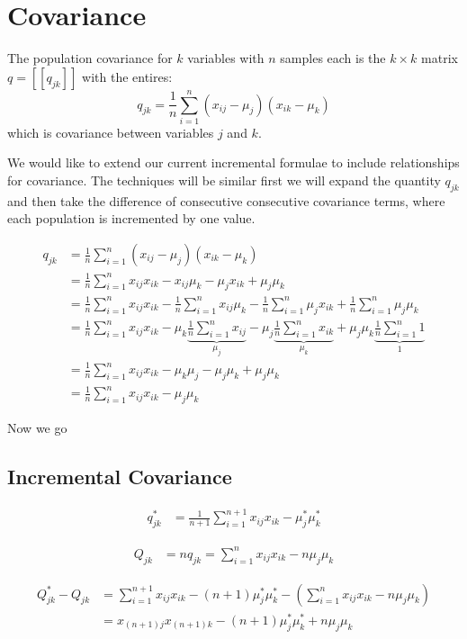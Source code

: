 \documentclass[english,12pt]{article}
\theoremstyle{plain}
\theoremstyle{definition}
\theoremstyle{definition} %
\newcommand{\brac}[1]{\left(#1\right)} %
\newcommand{\sqbrac}[1]{\left[#1\right]} %
\begin{document}
\section{Covariance}
The population covariance for $k$ variables with $n$ samples each is the $k\times k$ matrix $q=\sqbrac{\sqbrac{q_{jk}}}$ with the entires:
\[q_{jk} = \frac{1}{n}\sum_{i=1}^n(x_{ij}-\mu_j)(x_{ik} - \mu_k)\]
which is covariance between variables $j$ and $k$.

We would like to extend our current incremental formulae to include relationships for covariance.  The techniques will be similar first we will expand the quantity $q_{jk}$ and then take the difference of consecutive consecutive covariance terms, where each population is incremented by one value.

\begin{align*}
q_{jk} &= \frac{1}{n}\sum_{i=1}^n(x_{ij}-\mu_j)(x_{ik} - \mu_k)\\
&= \frac{1}{n}\sum_{i=1}^nx_{ij}x_{ik} - x_{ij}\mu_k - \mu_jx_{ik}+\mu_j\mu_k\\
&= \frac{1}{n}\sum_{i=1}^nx_{ij}x_{ik} - \frac{1}{n}\sum_{i=1}^nx_{ij}\mu_k - \frac{1}{n}\sum_{i=1}^n\mu_jx_{ik}+\frac{1}{n}\sum_{i=1}^n\mu_j\mu_k\\
&= \frac{1}{n}\sum_{i=1}^nx_{ij}x_{ik} - \mu_k\underbrace{\frac{1}{n}\sum_{i=1}^nx_{ij}}_{\mu_j} - \mu_j\underbrace{\frac{1}{n}\sum_{i=1}^nx_{ik}}_{\mu_k}+\mu_j\mu_k\underbrace{\frac{1}{n}\sum_{i=1}^n1}_{1}\\
&= \frac{1}{n}\sum_{i=1}^nx_{ij}x_{ik} - \mu_k\mu_j - \mu_j\mu_k+\mu_j\mu_k\\
&= \frac{1}{n}\sum_{i=1}^nx_{ij}x_{ik} - \mu_j\mu_k
\end{align*}

Now we go

\subsection{Incremental Covariance}
\begin{align*}
q_{jk}^\ast &= \frac{1}{n+1}\sum_{i=1}^{n+1}x_{ij}x_{ik} - \mu_j^\ast\mu_k^\ast
\end{align*}


\begin{align*}
Q_{jk} &= n q_{jk} 
= \sum_{i=1}^nx_{ij}x_{ik} - n\mu_j\mu_k
\end{align*}

\begin{align*}
Q_{jk}^\ast - Q_{jk} &= \sum_{i=1}^{n+1}x_{ij}x_{ik} - (n+1)\mu_j^\ast\mu_k^\ast - \brac{\sum_{i=1}^nx_{ij}x_{ik} - n\mu_j\mu_k}\\
&=x_{(n+1)j}x_{(n+1)k} - (n+1)\mu_j^\ast\mu_k^\ast + n\mu_j\mu_k
\end{align*}
\end{document}
